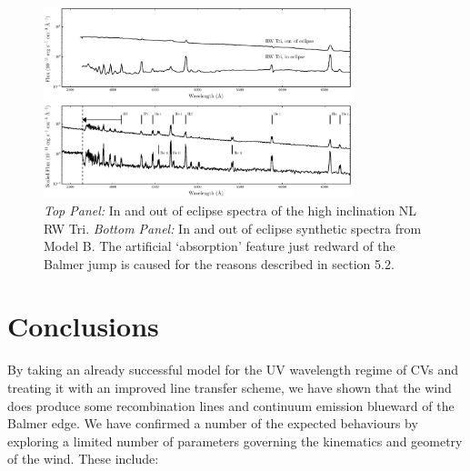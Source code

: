 \documentclass[preprint, a4paper, 11pt]{aastex}
\begin{document}
\begin{figure} %
\includegraphics[width=0.8\textwidth]{figures/fig13_eclipse.eps}
\caption{{\sl Top Panel:} In and out of eclipse spectra of the high
inclination NL RW Tri. {\sl Bottom Panel:} In and out of eclipse synthetic
spectra from Model B.
The artificial `absorption' feature just redward of the Balmer jump
is caused for the reasons described in section 5.2.}
\label{rwtricomp}
\end{figure} %








%
%


\section{Conclusions}

By taking an already successful model
for the UV wavelength regime of CVs and treating 
it with an improved line transfer scheme, we have shown
that the wind does produce some recombination lines
and continuum emission blueward of the Balmer edge.
We have confirmed a number of the expected behaviours
by exploring a limited number of parameters governing the
kinematics and geometry of the wind. These include:
\end{document}

